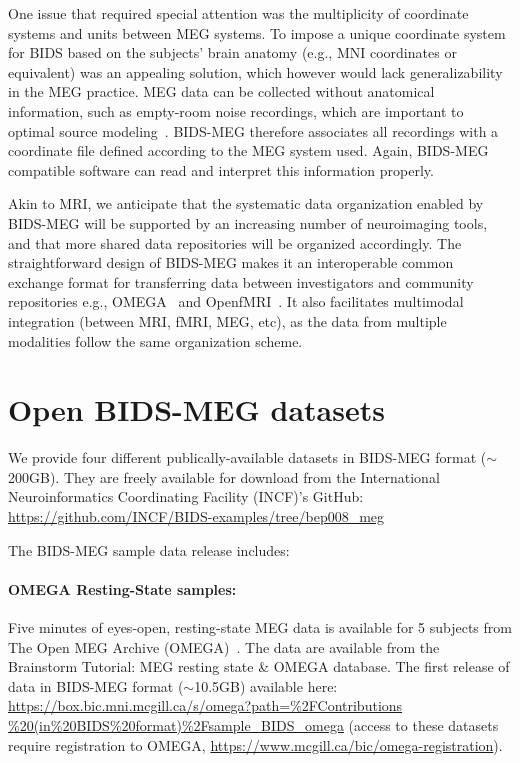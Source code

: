 One issue that required special attention was the multiplicity of coordinate systems and units between MEG systems. To impose a unique coordinate system for BIDS based on the subjects’ brain anatomy (e.g., MNI coordinates or equivalent) was an appealing solution, which however would lack generalizability in the MEG practice. MEG data can be collected without anatomical information, such as empty-room noise recordings, which are important to optimal source modeling~\citep{gross-etal:13}. BIDS-MEG therefore associates all recordings with a coordinate file defined according to the MEG system used. Again, BIDS-MEG compatible software can read and interpret this information properly.

Akin to MRI, we anticipate that the systematic data organization enabled by BIDS-MEG will be supported by an increasing number of neuroimaging tools, and that more shared data repositories will be organized accordingly. The straightforward design of BIDS-MEG makes it an interoperable common exchange format for transferring data between investigators and community repositories e.g., OMEGA~\citep{niso2016omega} and OpenfMRI~\citep{poldrack2017openfmri}. It also facilitates multimodal integration (between MRI, fMRI, MEG, etc), as the data from multiple modalities follow the same organization scheme.

\section{Open BIDS-MEG datasets}
We provide four different publically-available datasets in BIDS-MEG format ($\sim$200GB). They are freely available for download from the International Neuroinformatics Coordinating Facility (INCF)’s  GitHub: \url{https://github.com/INCF/BIDS-examples/tree/bep008_meg}

The BIDS-MEG sample data release includes: 

\paragraph{OMEGA Resting-State samples:} Five minutes of eyes-open, resting-state MEG data is available for 5 subjects from The Open MEG Archive (OMEGA)~\citep{niso2016omega}. The data are available from the Brainstorm Tutorial: MEG resting state \& OMEGA database. The first release of data in BIDS-MEG format ($\sim$10.5GB) available here: 
\url{https://box.bic.mni.mcgill.ca/s/omega?path=\%2FContributions
\%20(in\%20BIDS\%20format)\%2Fsample_BIDS_omega} (access to these datasets require registration to OMEGA, \url{https://www.mcgill.ca/bic/omega-registration}).

